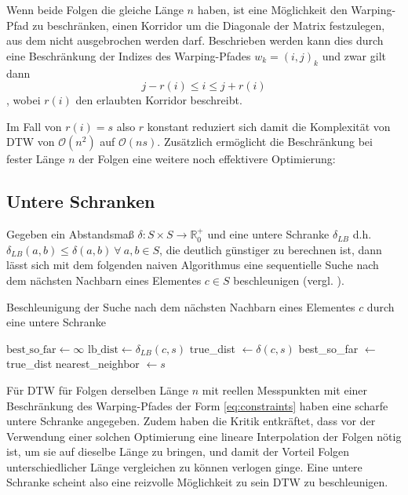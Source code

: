 Wenn beide Folgen die gleiche Länge $n$ haben, ist eine Möglichkeit den Warping-Pfad zu beschränken, einen Korridor um die Diagonale der Matrix festzulegen, aus dem nicht ausgebrochen werden darf. Beschrieben werden kann dies durch eine Beschränkung der Indizes des Warping-Pfades \( w_k = (i,j)_k \) und zwar gilt dann
\begin{equation}
  \label{eq:constraints}
  j - r(i) \leq i \leq j + r(i)
\end{equation}
, wobei $r(i)$ den erlaubten Korridor beschreibt.

Im Fall von \(r(i) = s\) also $r$ konstant reduziert sich damit die Komplexität von DTW von \( \mathcal{O}(n^2) \) auf \( \mathcal{O}(ns) \). Zusätzlich ermöglicht die Beschränkung bei fester Länge $n$ der Folgen eine weitere noch effektivere Optimierung:

\subsection{Untere Schranken} %
\label{sub:lower_bounding}

Gegeben ein Abstandsmaß \( \delta : S\times S \rightarrow \mathbb{R}_0^+ \) und eine untere Schranke \( \delta_{LB} \) d.h. \( \delta_{LB}(a,b) \leq \delta(a,b) ~\forall~ a,b \in S \), die deutlich günstiger zu berechnen ist, dann lässt sich mit dem folgenden naiven Algorithmus eine sequentielle Suche nach dem nächsten Nachbarn eines Elementes \( c \in S \) beschleunigen (vergl. \cite{Keogh:2005p7751}).

\begin{algorithm}
  \caption{Beschleunigung der Suche nach dem nächsten Nachbarn eines Elementes \(c\) durch eine untere Schranke}
  \begin{algorithmic}
    \STATE $\text{best\_so\_far} \gets \infty$
      \STATE $\text{lb\_dist} \gets \delta_{LB}(c,s)$
        \STATE true\_dist $\gets \delta(c,s)$
          \STATE best\_so\_far $\gets$ true\_dist
          \STATE nearest\_neighbor $\gets s$
        \ENDIF
      \ENDIF
    \ENDFOR
  \end{algorithmic}
\end{algorithm}

Für DTW für Folgen derselben Länge $n$ mit reellen Messpunkten mit einer Beschränkung des Warping-Pfades der Form \ref{eq:constraints} haben \citet{Keogh:2005p7751} eine scharfe untere Schranke angegeben. Zudem haben \citet{Ratanamahatana:2004p7522} die Kritik entkräftet, dass vor der Verwendung einer solchen Optimierung eine lineare Interpolation der Folgen nötig ist, um sie auf dieselbe Länge zu bringen, und damit der Vorteil Folgen unterschiedlicher Länge vergleichen zu können verlogen ginge. Eine untere Schranke scheint also eine reizvolle Möglichkeit zu sein DTW zu beschleunigen.

